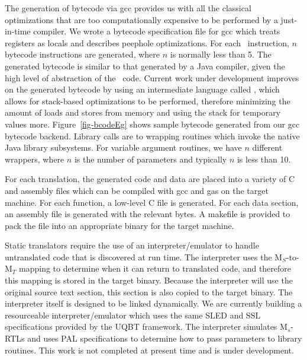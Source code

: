 The generation of bytecode via gcc provides us with all the
classical optimizations that are too computationally expensive to be
performed by a just-in-time compiler.  
We wrote a bytecode specification file for gcc which treats registers 
as locals and describes peephole optimizations.  
For each \hrtl\ instruction, $n$ bytecode instructions are 
generated, where $n$ is normally less than 5.  The generated
bytecode is similar to that generated by a Java compiler, 
given the high level of abstraction of the \hrtl\ code.  
Current work under development improves on the generated bytecode 
by using an intermediate language called \bcode, which allows 
for stack-based optimizations to be performed, therefore minimizing the 
amount of loads and stores from memory and using the stack 
for temporary values more. 
Figure~\ref{fig-bcodeEg} shows sample bytecode generated from our 
gcc bytecode backend.  Library calls are to wrapping routines 
which invoke the native Java library subsystems.  For variable
argument routines, we have $n$ different wrappers, where $n$ is
the number of parameters and typically $n$ is less than 10. 

For each translation, the generated code and data are 
placed into a variety of C and assembly files which can be 
compiled with gcc and gas on the target machine.  
For each function, a low-level C file is generated. 
For each data section, an assembly file is generated with the  
relevant bytes. 
A makefile is provided to pack the file into an appropriate 
binary for the target machine.

Static translators require the use of an interpreter/emulator to handle 
untranslated code that is discovered at run time.  
The interpreter uses the M$_S$-to-M$_T$ mapping to determine when 
it can return to translated code, and therefore this mapping is stored 
in the target binary.
Because the interpreter will use the original source text section, 
this section is also copied to the target binary.
The interpreter itself is designed to be linked dynamically.
We are currently building a resourceable interpreter/emulator which uses 
the same SLED and SSL specifications provided by the UQBT framework.
The interpreter simulates M$_s$-RTLs and uses PAL specifications 
to determine how to pass parameters to library routines.  
This work is not completed at present time and is under development.

